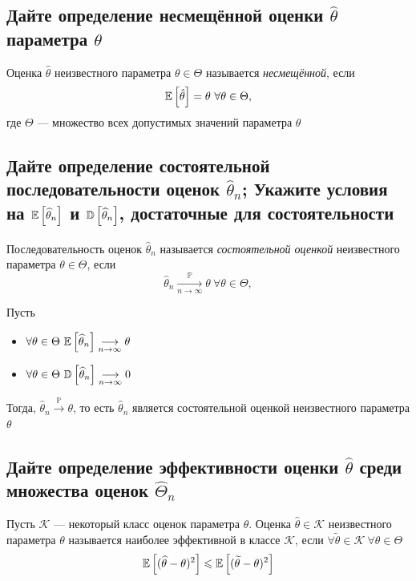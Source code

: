 \documentclass{article}
\begin{document}
\subsection{Дайте определение несмещённой оценки $\widehat{\theta}$ параметра $\theta$}
Оценка $\hat{\theta}$ неизвестного параметра $\theta\in\Theta$ называется \textit{несмещённой}, если 
\begin{equation*}
    \matwait{\hat{\theta}}=\theta\ \forall\theta\in\Theta,
\end{equation*}
где $\Theta$ — множество всех допустимых значений параметра $\theta$


\subsection{Дайте определение состоятельной последовательности оценок $\widehat{\theta}_n$; Укажите условия на $\mathbb{E}\left[\widehat{\theta}_n\right]$ и $\mathbb{D}\left[\widehat{\theta}_n\right]$, достаточные для состоятельности}
 Последовательность оценок $\hat{\theta}_n$ называется \textit{состоятельной оценкой} неизвестного параметра $\theta\in\Theta$, если
\begin{equation*}
    \hat{\theta}_n\underset{n\to\infty}{\overset{\mathbb{P}}{\longrightarrow}}\theta\ \forall \theta\in\Theta,
\end{equation*}

\theorem Пусть 
\begin{itemize}
    \item $\forall\theta\in\Theta\ \matwait{\widehat{\theta}_n}\underset{n\to\infty}{\longrightarrow}\theta$
    \item $\forall\theta\in\Theta\ \dispersia{\widehat{\theta}_n}\underset{n\to\infty}{\longrightarrow}0$
\end{itemize}
Тогда, $\widehat{\theta}_n\overset{\mathbb{P}}{\longrightarrow}\theta$, то есть $\widehat{\theta}_n$ является состоятельной оценкой  неизвестного параметра $\theta$




\subsection{Дайте определение эффективности оценки $\widehat{\theta}$ среди множества оценок $\widehat{\Theta}_n$}
 Пусть $\mathcal{K}$ — некоторый класс оценок параметра $\theta$. Оценка $\widehat{\theta}\in\mathcal{K}$ неизвестного параметра $\theta$ называется наиболее эффективной в классе $\mathcal{K}$, если $\forall\widetilde{\theta}\in\mathcal{K}\ \forall \theta\in\Theta$
\begin{equation*}
    \begin{aligned}
        \mathbb{E}\left[(\widehat{\theta}-\theta)^2\right]\leqslant\mathbb{E}\left[(\widetilde{\theta}-\theta)^2\right]
    \end{aligned}
\end{equation*}
\end{document}
